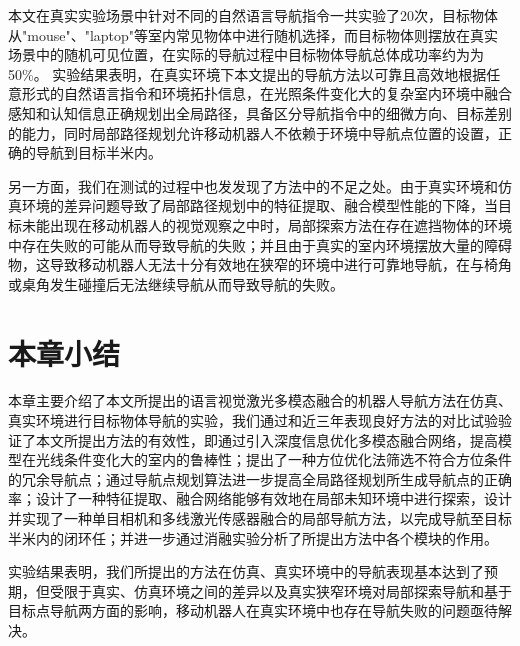 本文在真实实验场景中针对不同的自然语言导航指令一共实验了20次，目标物体从"mouse"、"laptop"等室内常见物体中进行随机选择，而目标物体则摆放在真实场景中的随机可见位置，在实际的导航过程中目标物体导航总体成功率约为为50\%。
实验结果表明，在真实环境下本文提出的导航方法以可靠且高效地根据任意形式的自然语言指令和环境拓扑信息，在光照条件变化大的复杂室内环境中融合感知和认知信息正确规划出全局路径，具备区分导航指令中的细微方向、目标差别的能力，同时局部路径规划允许移动机器人不依赖于环境中导航点位置的设置，正确的导航到目标半米内。

另一方面，我们在测试的过程中也发发现了方法中的不足之处。由于真实环境和仿真环境的差异问题导致了局部路径规划中的特征提取、融合模型性能的下降，当目标未能出现在移动机器人的视觉观察之中时，局部探索方法在存在遮挡物体的环境中存在失败的可能从而导致导航的失败；并且由于真实的室内环境摆放大量的障碍物，这导致移动机器人无法十分有效地在狭窄的环境中进行可靠地导航，在与椅角或桌角发生碰撞后无法继续导航从而导致导航的失败。


\section{本章小结}

本章主要介绍了本文所提出的语言视觉激光多模态融合的机器人导航方法在仿真、真实环境进行目标物体导航的实验，我们通过和近三年表现良好方法的对比试验验证了本文所提出方法的有效性，即通过引入深度信息优化多模态融合网络，提高模型在光线条件变化大的室内的鲁棒性；提出了一种方位优化法筛选不符合方位条件的冗余导航点；通过导航点规划算法进一步提高全局路径规划所生成导航点的正确率；设计了一种特征提取、融合网络能够有效地在局部未知环境中进行探索，设计并实现了一种单目相机和多线激光传感器融合的局部导航方法，以完成导航至目标半米内的闭环任；并进一步通过消融实验分析了所提出方法中各个模块的作用。

实验结果表明，我们所提出的方法在仿真、真实环境中的导航表现基本达到了预期，但受限于真实、仿真环境之间的差异以及真实狭窄环境对局部探索导航和基于目标点导航两方面的影响，移动机器人在真实环境中也存在导航失败的问题亟待解决。
